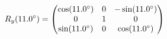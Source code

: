 \documentclass[preview]{standalone}
\begin{document}
\begin{align*}
\special{dvisvgm:raw <g id='unique000'>}R_y(11.0^\circ) = \begin{pmatrix} \cos(11.0^\circ) & 0 & -\sin(11.0^\circ) \\ 0 & 1 & 0 \\ \sin(11.0^\circ) & 0 & \cos(11.0^\circ) \end{pmatrix}\special{dvisvgm:raw </g>}
\end{align*}
\end{document}
